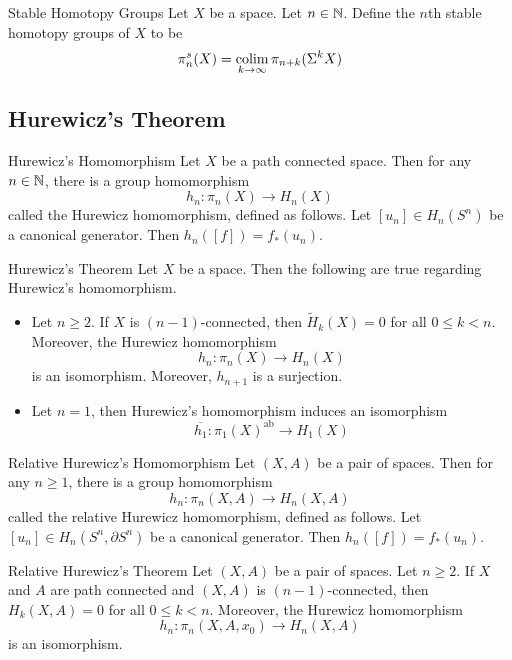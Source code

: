 \documentclass[a4paper]{article}
\begin{document}
\begin{defn}{Stable Homotopy Groups}{} Let $X$ be a space. Let $n\in\mathbb{N}$. Define the $n$th stable homotopy groups of $X$ to be $$\pi_n^s(X)=\operatorname*{colim}_{k\to\infty}\pi_{n+k}(\Sigma^kX)$$
\end{defn}

\subsection{Hurewicz's Theorem}
\begin{thm}{Hurewicz's Homomorphism}{} Let $X$ be a path connected space. Then for any $n\in\mathbb{N}$, there is a group homomorphism $$h_n:\pi_n(X)\to H_n(X)$$ called the Hurewicz homomorphism, defined as follows. Let $[u_n]\in H_n(S^n)$ be a canonical generator. Then $h_n([f])=f_\ast(u_n)$. 
\end{thm}

\begin{thm}{Hurewicz's Theorem}{} Let $X$ be a space. Then the following are true regarding Hurewicz's homomorphism. 
\begin{itemize}
\item Let $n\geq 2$. If $X$ is $(n-1)$-connected, then $\widetilde{H}_k(X)=0$ for all $0\leq k<n$. Moreover, the Hurewicz homomorphism $$h_n:\pi_n(X)\to H_n(X)$$ is an isomorphism. Moreover, $h_{n+1}$ is a surjection. 
\item Let $n=1$, then Hurewicz's homomorphism induces an isomorphism $$\overline{h_1}:\pi_1(X)^\text{ab}\to H_1(X)$$ 
\end{itemize}
\end{thm}

\begin{thm}{Relative Hurewicz's Homomorphism}{} Let $(X,A)$ be a pair of spaces. Then for any $n\geq 1$, there is a group homomorphism $$h_n:\pi_n(X,A)\to H_n(X,A)$$ called the relative Hurewicz homomorphism, defined as follows. Let $[u_n]\in H_n(S^n,\partial S^n)$ be a canonical generator. Then $h_n([f])=f_\ast(u_n)$. 
\end{thm}

\begin{thm}{Relative Hurewicz's Theorem}{} Let $(X,A)$ be a pair of spaces. Let $n\geq 2$. If $X$ and $A$ are path connected and $(X,A)$ is $(n-1)$-connected, then $H_k(X,A)=0$ for all $0\leq k<n$. Moreover, the Hurewicz homomorphism $$h_n:\pi_n(X,A,x_0)\to H_n(X,A)$$ is an isomorphism. 
\end{thm}
\end{document}
